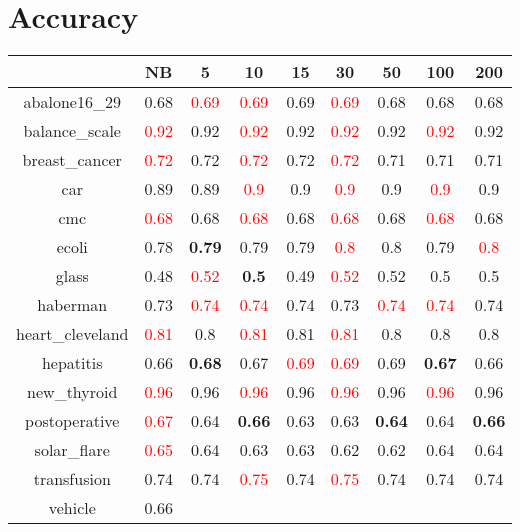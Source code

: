 \documentclass{article}%
\begin{document}
%
\normalsize%
\section*{Accuracy}%
\begin{tabular}{c|cccccccc}%
\hline%
&NB&5&10&15&30&50&100&200\\%
\hline%
abalone16\_29&0.68&\textcolor{red}{ 
0.69
}&\textcolor{red}{ 
0.69
}&0.69&\textcolor{red}{ 
0.69
}&0.68&0.68&0.68\\%
\hline%
balance\_scale&\textcolor{red}{ 
0.92
}&0.92&\textcolor{red}{ 
0.92
}&0.92&\textcolor{red}{ 
0.92
}&0.92&\textcolor{red}{ 
0.92
}&0.92\\%
\hline%
breast\_cancer&\textcolor{red}{ 
0.72
}&0.72&\textcolor{red}{ 
0.72
}&0.72&\textcolor{red}{ 
0.72
}&0.71&0.71&0.71\\%
\hline%
car&0.89&0.89&\textcolor{red}{ 
0.9
}&0.9&\textcolor{red}{ 
0.9
}&0.9&\textcolor{red}{ 
0.9
}&0.9\\%
\hline%
cmc&\textcolor{red}{ 
0.68
}&0.68&\textcolor{red}{ 
0.68
}&0.68&\textcolor{red}{ 
0.68
}&0.68&\textcolor{red}{ 
0.68
}&0.68\\%
\hline%
ecoli&0.78&\textbf{0.79}&0.79&0.79&\textcolor{red}{ 
0.8
}&0.8&0.79&\textcolor{red}{ 
0.8
}\\%
\hline%
glass&0.48&\textcolor{red}{ 
0.52
}&\textbf{0.5}&0.49&\textcolor{red}{ 
0.52
}&0.52&0.5&0.5\\%
\hline%
haberman&0.73&\textcolor{red}{ 
0.74
}&\textcolor{red}{ 
0.74
}&0.74&0.73&\textcolor{red}{ 
0.74
}&\textcolor{red}{ 
0.74
}&0.74\\%
\hline%
heart\_cleveland&\textcolor{red}{ 
0.81
}&0.8&\textcolor{red}{ 
0.81
}&0.81&\textcolor{red}{ 
0.81
}&0.8&0.8&0.8\\%
\hline%
hepatitis&0.66&\textbf{0.68}&0.67&\textcolor{red}{ 
0.69
}&\textcolor{red}{ 
0.69
}&0.69&\textbf{0.67}&0.66\\%
\hline%
new\_thyroid&\textcolor{red}{ 
0.96
}&0.96&\textcolor{red}{ 
0.96
}&0.96&\textcolor{red}{ 
0.96
}&0.96&\textcolor{red}{ 
0.96
}&0.96\\%
\hline%
postoperative&\textcolor{red}{ 
0.67
}&0.64&\textbf{0.66}&0.63&0.63&\textbf{0.64}&0.64&\textbf{0.66}\\%
\hline%
solar\_flare&\textcolor{red}{ 
0.65
}&0.64&0.63&0.63&0.62&0.62&0.64&0.64\\%
\hline%
transfusion&0.74&0.74&\textcolor{red}{ 
0.75
}&0.74&\textcolor{red}{ 
0.75
}&0.74&0.74&0.74\\%
\hline%
vehicle&0.66&\textcolor{red}{ 
}
\end{tabular}
\end{document}
